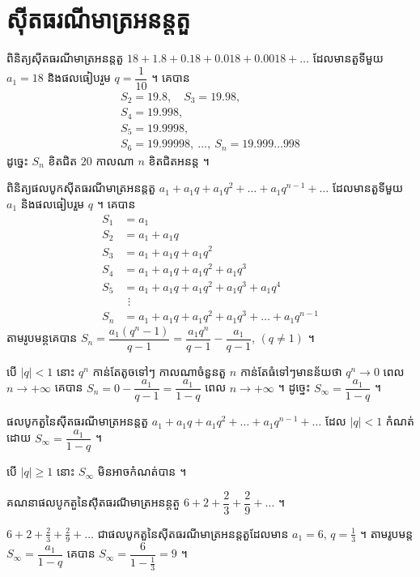 \section{ស៊ីតធរណីមាត្រអនន្តតួ}

\begin{example}[ឧទាហរណ៍]
ពិនិត្យស៊ីតធរណីមាត្រអនន្តតួ $18 + 1.8 + 0.18 + 0.018 + 0.0018 + \ldots$ ដែលមានតួទីមួយ $a_1 = 18$ និងផលធៀបរួម $q = \dfrac{1}{10}$ ។ គេបាន
\[
\begin{gathered}
S_2 = 19.8, \quad S_3 = 19.98,\\
S_4 = 19.998,\\
S_5 = 19.9998,\\ S_6 = 19.99998,\ \ldots,\ S_n = 19.999\ldots998
\end{gathered}
\]
ដូច្នេះ $S_n$ ខិតជិត $20$ កាលណា $n$ ខិតជិតអនន្ត ។
\end{example}

ពិនិត្យផលបូកស៊ីតធរណីមាត្រអនន្តតួ $a_1 + a_1 q + a_1 q^2 + \ldots + a_1 q^{n-1} + \ldots$ ដែលមានតួទីមួយ $a_1$ និងផលធៀបរួម $q$ ។ គេបាន
\[
\begin{aligned}
S_1 &= a_1\\
S_2 &= a_1 + a_1 q\\
S_3 &= a_1 + a_1 q + a_1 q^2\\
S_4 &= a_1 + a_1 q + a_1 q^2 + a_1 q^3\\
S_5 &= a_1 + a_1 q + a_1 q^2 + a_1 q^3 + a_1 q^4\\
&\ \,\vdots\\
S_n &= a_1 + a_1 q + a_1 q^2 + a_1 q^3 + \ldots + a_1 q^{n-1}
\end{aligned}
\]
តាមរូបមន្តគេបាន $S_n = \dfrac{a_1(q^n - 1)}{q - 1} = \dfrac{a_1 q^n}{q - 1} - \dfrac{a_1}{q - 1}$, $(q \ne 1)$ ។

បើ $|q| < 1$ នោះ $q^n$ កាន់តែតូចទៅៗ កាលណាចំនួនតួ $n$ កាន់តែធំទៅៗមានន័យថា $q^n \to 0$ ពេល $n \to +\infty$ គេបាន $S_n = 0 - \dfrac{a_1}{q - 1} = \dfrac{a_1}{1 - q}$ ពេល $n \to +\infty$ ។ ដូច្នេះ $S_\infty = \dfrac{a_1}{1 - q}$ ។

\begin{formulaBox}[ជាទូទៅ]
ផលបូកតួនៃស៊ីតធរណីមាត្រអនន្តតួ $a_1 + a_1 q + a_1 q^2 + \ldots + a_1 q^{n-1} + \ldots$ ដែល $|q| < 1$ កំណត់ដោយ $S_\infty = \dfrac{a_1}{1 - q}$ ។
\end{formulaBox}

\begin{note}
បើ $|q| \ge 1$ នោះ $S_\infty$ មិនអាចកំណត់បាន ។
\end{note}

\begin{example}[លំហាត់គំរូ ១]
គណនាផលបូកតួនៃស៊ីតធរណីមាត្រអនន្តតួ $6 + 2 + \dfrac{2}{3} + \dfrac{2}{9} + \ldots$ ។
\end{example}
\ans
$6 + 2 + \frac{2}{3} + \frac{2}{9} + \ldots$ ជាផលបូកតួនៃស៊ីតធរណីមាត្រអនន្តតួដែលមាន $a_1 = 6$, $q = \frac{1}{3}$ ។ តាមរូបមន្ត $S_\infty = \dfrac{a_1}{1 - q}$ គេបាន $S_\infty = \dfrac{6}{1 - \frac{1}{3}} = 9$ ។

